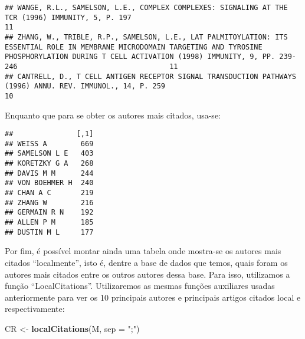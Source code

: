 \documentclass[]{article}
\newenvironment{Shaded}{\begin{snugshade}}{\end{snugshade}}
\newcommand{\DataTypeTok}[1]{\textcolor[rgb]{0.13,0.29,0.53}{#1}}
\newcommand{\DecValTok}[1]{\textcolor[rgb]{0.00,0.00,0.81}{#1}}
\newcommand{\KeywordTok}[1]{\textcolor[rgb]{0.13,0.29,0.53}{\textbf{#1}}}
\newcommand{\NormalTok}[1]{#1}
\newcommand{\OperatorTok}[1]{\textcolor[rgb]{0.81,0.36,0.00}{\textbf{#1}}}
\newcommand{\StringTok}[1]{\textcolor[rgb]{0.31,0.60,0.02}{#1}}
\begin{document}
\begin{verbatim}
## WANGE, R.L., SAMELSON, L.E., COMPLEX COMPLEXES: SIGNALING AT THE TCR (1996) IMMUNITY, 5, P. 197                                                                                                                                            11
## ZHANG, W., TRIBLE, R.P., SAMELSON, L.E., LAT PALMITOYLATION: ITS ESSENTIAL ROLE IN MEMBRANE MICRODOMAIN TARGETING AND TYROSINE PHOSPHORYLATION DURING T CELL ACTIVATION (1998) IMMUNITY, 9, PP. 239-246                                    11
## CANTRELL, D., T CELL ANTIGEN RECEPTOR SIGNAL TRANSDUCTION PATHWAYS (1996) ANNU. REV. IMMUNOL., 14, P. 259                                                                                                                                  10
\end{verbatim}

Enquanto que para se obter os autores mais citados, usa-se:

\begin{Shaded}
\end{Shaded}

\begin{verbatim}
##               [,1]
## WEISS A        669
## SAMELSON L E   403
## KORETZKY G A   268
## DAVIS M M      244
## VON BOEHMER H  240
## CHAN A C       219
## ZHANG W        216
## GERMAIN R N    192
## ALLEN P M      185
## DUSTIN M L     177
\end{verbatim}

Por fim, é possível montar ainda uma tabela onde mostra-se os autores
mais citados ``localmente'', isto é, dentre a base de dados que temos,
quais foram os autores mais citados entre os outros autores dessa base.
Para isso, utilizamos a função ``LocalCitations''. Utilizaremos as
mesmas funções auxiliares usadas anteriormente para ver os 10 principais
autores e principais artigos citados local e respectivamente:

\begin{Shaded}
\begin{Highlighting}[]
\NormalTok{CR <-}\StringTok{ }\KeywordTok{localCitations}\NormalTok{(M, }\DataTypeTok{sep =} \StringTok{";"}\NormalTok{)}
\end{Highlighting}
\end{Shaded}
\end{document}
